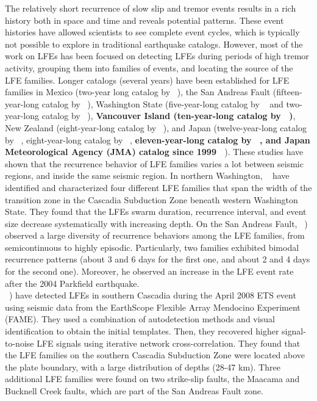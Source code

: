 \documentclass[draft]{agujournal2019}
\begin{document}
The relatively short recurrence of slow slip and tremor events results in a rich history both in space and time and reveals potential patterns.  These event histories have allowed scientists to see complete event cycles, which is typically not possible to explore in traditional earthquake catalogs. However, most of the work on LFEs has been focused on detecting LFEs during periods of high tremor activity, grouping them into families of events, and locating the source of the LFE families. Longer catalogs (several years) have been established for LFE families in Mexico (two-year long catalog by ~), the San Andreas Fault (fifteen-year-long catalog by ~), Washington State (five-year-long catalog by ~ and two-year-long catalog by ~), \textbf{Vancouver Island (ten-year-long catalog by ~)}, New Zealand (eight-year-long catalog by ~), and Japan (twelve-year-long catalog by ~, eight-year-long catalog by ~, \textbf{eleven-year-long catalog by ~, and Japan Meteorological Agency (JMA) catalog since 1999 ~\cite{KAT_2003}}). These studies have shown that the recurrence behavior of LFE families varies a lot between seismic regions, and inside the same seismic region. In northern Washington, ~ have identified and characterized four different LFE families that span the width of the transition zone in the Cascadia Subduction Zone beneath western Washington State. They found that the LFEs swarm duration, recurrence interval, and event size decrease systematically with increasing depth. On the San Andreas Fault, ~) observed a large diversity of recurrence behaviors among the LFE families, from semicontinuous to highly episodic. Particularly, two families exhibited bimodal recurrence patterns (about 3 and 6 days for the first one, and about 2 and 4 days for the second one). Moreover, he observed an increase in the LFE event rate after the 2004 Parkfield earthquake. \\

~) have detected LFEs in southern Cascadia during the April 2008 ETS event using seismic data from the EarthScope Flexible Array Mendocino Experiment (FAME). They used a combination of autodetection methods and visual identification to obtain the initial templates. Then, they recovered higher signal-to-noise LFE signals using iterative network cross-correlation. They found that the LFE families on the southern Cascadia Subduction Zone were located above the plate boundary, with a large distribution of depths (28-47 km). Three additional LFE families were found on two strike-slip faults, the Maacama and Bucknell Creek faults, which are part of the San Andreas Fault zone. \\
\end{document}
